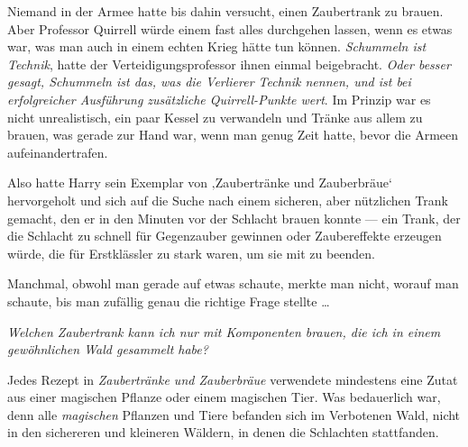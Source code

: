 Niemand in der Armee hatte bis dahin versucht, einen Zaubertrank zu brauen. Aber Professor Quirrell würde einem fast alles durchgehen lassen, wenn es etwas war, was man auch in einem echten Krieg hätte tun können. \emph{Schummeln ist Technik}, hatte der Verteidigungsprofessor ihnen einmal beigebracht. \emph{Oder besser gesagt, Schummeln ist das, was die Verlierer Technik nennen, und ist bei erfolgreicher Ausführung zusätzliche Quirrell-Punkte wert}. Im Prinzip war es nicht unrealistisch, ein paar Kessel zu verwandeln und Tränke aus allem zu brauen, was gerade zur Hand war, wenn man genug Zeit hatte, bevor die Armeen aufeinandertrafen.

Also hatte Harry sein Exemplar von ‚Zaubertränke und Zauberbräue‘ hervorgeholt und sich auf die Suche nach einem sicheren, aber nützlichen Trank gemacht, den er in den Minuten vor der Schlacht brauen konnte — ein Trank, der die Schlacht zu schnell für Gegenzauber gewinnen oder Zaubereffekte erzeugen würde, die für Erstklässler zu stark waren, um sie mit  zu beenden.

Manchmal, obwohl man gerade auf etwas schaute, merkte man nicht, worauf man schaute, bis man zufällig genau die richtige Frage stellte …

\emph{Welchen Zaubertrank kann ich nur mit Komponenten brauen, die ich in einem gewöhnlichen Wald gesammelt habe?}

Jedes Rezept in \emph{Zaubertränke und Zauberbräue} verwendete mindestens eine Zutat aus einer magischen Pflanze oder einem magischen Tier. Was bedauerlich war, denn alle \emph{magischen} Pflanzen und Tiere befanden sich im Verbotenen Wald, nicht in den sichereren und kleineren Wäldern, in denen die Schlachten stattfanden.


